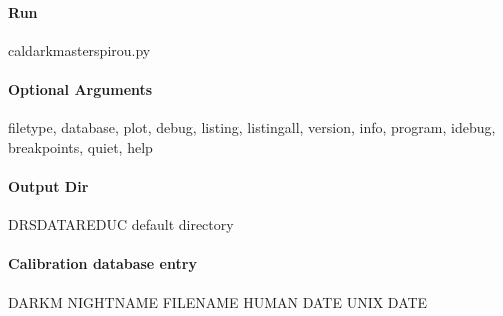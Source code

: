 \documentclass[a4paper,10pt,english]{report}
\begin{document}
\paragraph{Run}
\label{\detokenize{user/spirou/recipes/dark_master:run}}
\begin{sphinxVerbatim}[commandchars=\\\{\}]
cal\PYGZus{}dark\PYGZus{}master\PYGZus{}spirou.py
\end{sphinxVerbatim}


\paragraph{Optional Arguments}
\label{\detokenize{user/spirou/recipes/dark_master:optional-arguments}}
\begin{sphinxVerbatim}[commandchars=\\\{\}]
\PYGZhy{}\PYGZhy{}filetype, \PYGZhy{}\PYGZhy{}database, \PYGZhy{}\PYGZhy{}plot,
\PYGZhy{}\PYGZhy{}debug, \PYGZhy{}\PYGZhy{}listing, \PYGZhy{}\PYGZhy{}listingall, \PYGZhy{}\PYGZhy{}version, \PYGZhy{}\PYGZhy{}info,
\PYGZhy{}\PYGZhy{}program, \PYGZhy{}\PYGZhy{}idebug, \PYGZhy{}\PYGZhy{}breakpoints, \PYGZhy{}\PYGZhy{}quiet, \PYGZhy{}\PYGZhy{}help
\end{sphinxVerbatim}


\paragraph{Output Dir}
\label{\detokenize{user/spirou/recipes/dark_master:output-dir}}
\begin{sphinxVerbatim}[commandchars=\\\{\}]
DRS\PYGZus{}DATA\PYGZus{}REDUC    default  directory
\end{sphinxVerbatim}


\paragraph{Calibration database entry}
\label{\detokenize{user/spirou/recipes/dark_master:calibration-database-entry}}
\begin{sphinxVerbatim}[commandchars=\\\{\}]
DARKM NIGHT\PYGZus{}NAME FILENAME HUMAN DATE UNIX DATE
\end{sphinxVerbatim}
\end{document}
